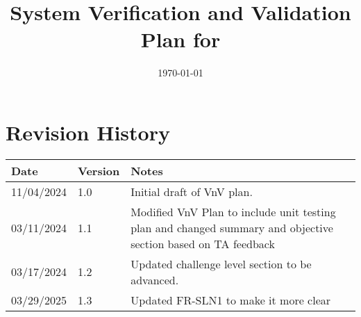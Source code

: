\documentclass[12pt, titlepage]{article}
\begin{document}
\title{System Verification and Validation Plan for \progname{}} 
\author{\authname}
\date{\today}
	
\maketitle


\section*{Revision History}

\begin{tabularx}{\textwidth}{p{3cm}p{2cm}X}
\toprule {\bf Date} & {\bf Version} & {\bf Notes}\\
\midrule
11/04/2024 & 1.0 & Initial draft of VnV plan.\\
03/11/2024 & 1.1 & Modified VnV Plan to include unit testing plan and changed summary and objective section based on TA feedback\\
03/17/2024 & 1.2 & Updated challenge level section to be advanced.\\
03/29/2025 & 1.3 & Updated FR-SLN1 to make it more clear\\

\bottomrule
\end{tabularx}

~\\


\newpage

\tableofcontents

\listoftables
\end{document}
